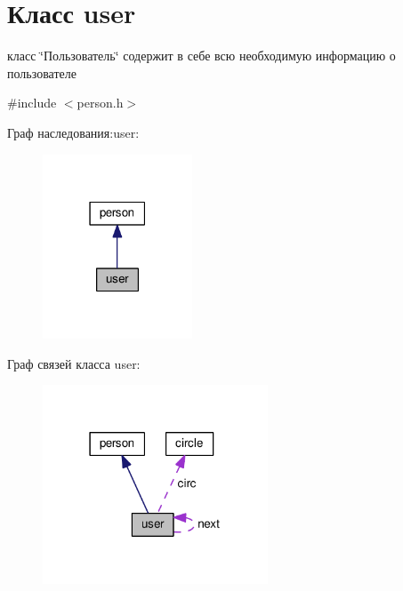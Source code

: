 \hypertarget{classuser}{\section{Класс user}
\label{classuser}
}


класс \char`\"{}Пользователь\char`\"{} содержит в себе всю необходимую информацию о пользователе  




{\ttfamily \#include $<$person.\-h$>$}



Граф наследования\-:user\-:\nopagebreak
\begin{figure}[H]
\begin{center}
\leavevmode
\includegraphics[width=126pt]{classuser__inherit__graph}
\end{center}
\end{figure}


Граф связей класса user\-:\nopagebreak
\begin{figure}[H]
\begin{center}
\leavevmode
\includegraphics[width=190pt]{classuser__coll__graph}
\end{center}
\end{figure}
